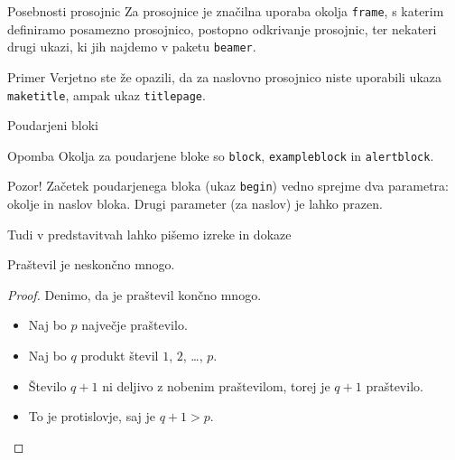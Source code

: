 \begin{frame}{Posebnosti prosojnic}
	    Za prosojnice je značilna uporaba okolja \texttt{frame},
	    s katerim definiramo posamezno prosojnico, \pause
	    postopno odkrivanje prosojnic, \pause
	    ter nekateri drugi ukazi, ki jih najdemo v paketu \texttt{beamer}. \pause
	\begin{exampleblock}{Primer}
		Verjetno ste že opazili, da za naslovno prosojnico niste uporabili
		ukaza \texttt{maketitle}, ampak ukaz \texttt{titlepage}.
	\end{exampleblock}	
\end{frame}


\begin{frame}{Poudarjeni bloki}

	\begin{block}{Opomba}
		Okolja za poudarjene bloke so \texttt{block}, \texttt{exampleblock} in \texttt{alertblock}.
	\end{block}	
	    
    \begin{alertblock}{Pozor!}
		Začetek poudarjenega bloka (ukaz \texttt{begin}) vedno sprejme 
		dva parametra: okolje in naslov bloka.
		Drugi parameter (za naslov) je lahko prazen. 
	\end{alertblock}
		
\end{frame}


\begin{frame}{Tudi v predstavitvah lahko pišemo izreke in dokaze}

	\begin{izrek}
	   Praštevil je neskončno mnogo.
	\end{izrek}

	\begin{proof}
	   Denimo, da je praštevil končno mnogo.
	   	
	   \begin{itemize}[<+->]
		  \item Naj bo $p$ \alert<4>{največje} praštevilo.
		  \item Naj bo $q$ produkt števil $1$, $2$, \ldots, $p$.
		  \item Število $q+1$ ni deljivo z nobenim praštevilom, torej je $q+1$ praštevilo.
		  \item To je protislovje, saj je $q+1>p$. \qedhere
	   \end{itemize}

	\end{proof}

 \end{frame}
 
